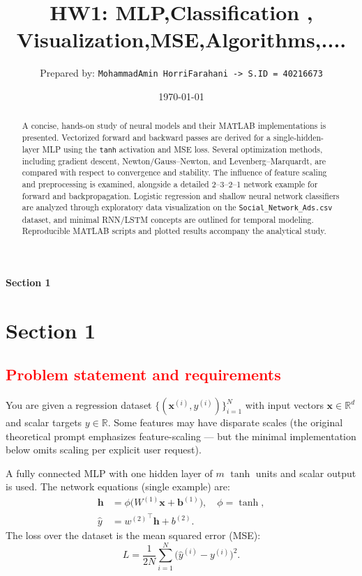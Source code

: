 \documentclass[11pt,a4paper]{article}
\title{\Huge\textbf{HW1: MLP,Classification , Visualization,MSE,Algorithms,....}}
\author{Prepared by: \texttt{MohammadAmin HorriFarahani -> S.ID = 40216673} }
\date{\today}
\begin{document}
\maketitle

\begin{abstract}
A concise, hands-on study of neural models and their MATLAB implementations is presented. Vectorized forward and backward passes are derived for a single-hidden-layer MLP using the \texttt{tanh} activation and MSE loss. Several optimization methods, including gradient descent, Newton/Gauss--Newton, and Levenberg--Marquardt, are compared with respect to convergence and stability. The influence of feature scaling and preprocessing is examined, alongside a detailed 2--3--2--1 network example for forward and backpropagation. Logistic regression and shallow neural network classifiers are analyzed through exploratory data visualization on the \texttt{Social\_Network\_Ads.csv} dataset, and minimal RNN/LSTM concepts are outlined for temporal modeling. Reproducible MATLAB scripts and plotted results accompany the analytical study.
\end{abstract}

\tableofcontents
\bigskip

\vspace{1cm} 
\begin{center}
\textbf{\Large Section 1}
\end{center}



\section{Section 1}

\subsection{\textcolor{red}{Problem statement and requirements}}
You are given a regression dataset $\{(\mathbf{x}^{(i)}, y^{(i)})\}_{i=1}^N$ with input vectors $\mathbf{x}\in\mathbb{R}^d$ and scalar targets $y\in\mathbb{R}$. Some features may have disparate scales (the original theoretical prompt emphasizes feature-scaling --- but the minimal implementation below omits scaling per explicit user request).

A fully connected MLP with one hidden layer of $m$ $\tanh$ units and scalar output is used. The network equations (single example) are:
\[
\begin{aligned}
\mathbf{h} &= \phi\!\big(W^{(1)}\mathbf{x} + \mathbf{b}^{(1)}\big), \quad \phi=\tanh,\\
\hat{y} &= {w^{(2)}}^\top \mathbf{h} + b^{(2)}.
\end{aligned}
\]
The loss over the dataset is the mean squared error (MSE):
\[
L = \frac{1}{2N}\sum_{i=1}^N \big(\hat y^{(i)} - y^{(i)}\big)^2.
\]
\end{document}

